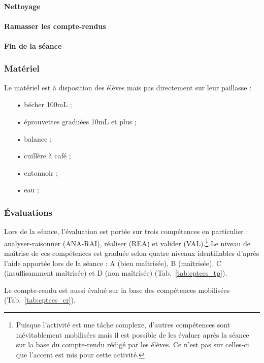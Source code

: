 \documentclass[12pt,a4paper]{article}
\newcommand{\rea}{\colorbox{yellow_c}{\textcolor{yellow_f}{REA}}}
\newcommand{\anarai}{\colorbox{green_c}{\textcolor{green_f}{ANA-RAI}}}
\newcommand{\val}{\colorbox{orange_c}{\textcolor{orange_f}{VAL}}}
\begin{document}
\paragraph{Nettoyage}

\paragraph{Ramasser les compte-rendus}
 
\paragraph{Fin de la séance}

\subsubsection{Matériel}

Le matériel est à disposition des élèves mais pas directement sur leur paillasse :
\begin{itemize}
\item[•] bécher \unit{100}{mL} ;
\item[•] éprouvettes graduées \unit{10}{mL} et plus ;
\item[•] balance ;
\item[•] cuillère à café ;
\item[•] entonnoir ;
\item[•] eau ;
\end{itemize}

\subsubsection{Évaluations}

Lors de la séance, l'évaluation est portée sur trois compétences en particulier : analyser-raisonner (\anarai{}), réaliser (\rea{}) et valider (\val{}).\footnote{Puisque l'activité est une tâche complexe, d'autres compétences sont inévitablement mobilisées mais il est possible de les évaluer après la séance sur la base du compte-rendu rédigé par les élèves.
Ce n'est pas sur celles-ci que l'accent est mis pour cette activité.}
Le niveau de maîtrise de ces compétences est graduée selon quatre niveaux identifiables d'après l'aide apportée lors de la séance : A (bien maîtrisée), B (maîtrisée), C (insuffisamment maîtrisée) et D (non maîtrisée) (Tab.~\ref{tab:cptces_tp}).

Le compte-rendu est aussi évalué sur la base des compétences mobilisées (Tab.~\ref{tab:cptces_cr}).
\end{document}
